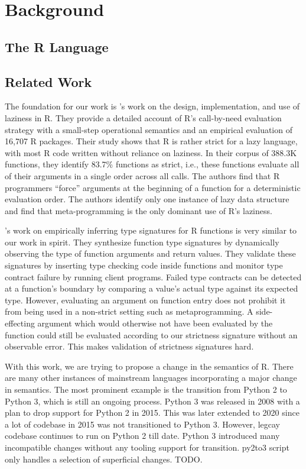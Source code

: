 \documentclass[screen,acmsmall]{acmart}
\begin{document}
\section{Background}
\subsection{The R Language}

\subsection{Related Work}
The foundation for our work is \cite{oopsla19b}'s work on the design,
implementation, and use of laziness in R. They provide a detailed account of R's
call-by-need evaluation strategy with a small-step operational semantics and an
empirical evaluation of 16,707 R packages. Their study shows that R is rather
strict for a lazy language, with most R code written without reliance on
laziness. In their corpus of 388.3K functions, they identify 83.7\% functions as
strict, i.e., these functions evaluate all of their arguments in a single order
across all calls. The authors find that R programmers ``force'' arguments at the
beginning of a function for a deterministic evaluation order. The authors
identify only one instance of lazy data structure and find that meta-programming
is the only dominant use of R's laziness.

\cite{oopsla20b}'s work on empirically inferring type signatures for R functions
is very similar to our work in spirit. They synthesize function type signatures
by dynamically observing the type of function arguments and return values. They
validate these signatures by inserting type checking code inside functions and
monitor type contract failure by running client programs. Failed type contracts
can be detected at a function's boundary by comparing a value's actual type
against its expected type. However, evaluating an argument on function entry
does not prohibit it from being used in a non-strict setting such as
metaprogramming. A side-effecting argument which would otherwise not have been
evaluated by the function could still be evaluated according to our strictness
signature without an observable error. This makes validation of strictness
signatures hard.

With this work, we are trying to propose a change in the semantics of R. There
are many other instances of mainstream languages incorporating a major change in
semantics. The most prominent example is the transition from Python 2 to Python
3, which is still an ongoing process. Python 3 was released in 2008 with a
plan\cite{pysunset} to drop support for Python 2 in 2015. This was later
extended to 2020 since a lot of codebase in 2015 was not transitioned to Python
3. However, legcay codebase continues to run on Python 2 till date. Python 3
introduced many incompatible changes without any tooling support for transition.
py2to3 script only handles a selection of superficial changes. TODO.
\end{document}
